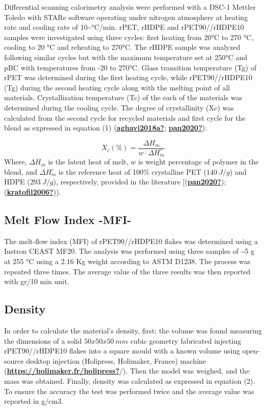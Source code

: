 \documentclass[
  12pt,
  number,
  review]{elsarticle}
\begin{document}
Differential scanning calorimetry analysis were performed with a DSC-1
Mettler Toledo with STARe software operating under nitrogen atmosphere
at heating rate and cooling rate of 10\textasciitilde°C/min. rPET, rHDPE
and rPET90//rHDPE10 samples were investigated using three cycles: first
heating from 20°C to 270 °C, cooling to 20 °C and reheating to 270°C.
The rHDPE sample was analyzed following similar cycles but with the
maximum temperature set at 250°C and pBC with temperatures from -20 to
270°C. Glass transition temperature (Tg) of rPET was determined during
the first heating cycle, while rPET90//rHDPE10 (Tg) during the second
heating cycle along with the melting point of all materials.
Crystallization temperature (Tc) of the each of the materials was
determined during the cooling cycle. The degree of crystallinity (Xc)
was calculated from the second cycle for recycled materials and first
cycle for the blend as expressed in equation (1)
(\protect\hyperlink{ref-aghavi2018a}{\textbf{aghavi2018a?}};
\protect\hyperlink{ref-pan2020}{\textbf{pan2020?}}):

\[
X_{c}(\%) = \frac{\Delta H_{m}}{w \cdot \Delta H_{m}^\circ}
\] Where, \(\Delta H_{m}\) is the latent heat of melt, \(w\) is weight
percentage of polymer in the blend, and \(\Delta H_{m}^\circ\) is the
reference heat of 100\% crystalline PET (\(140~J/g\)) and HDPE
(\(293~J/g\)), respectively, provided in the literature
{[}(\protect\hyperlink{ref-pan2020}{\textbf{pan2020?}});
(\protect\hyperlink{ref-kratofil2006}{\textbf{kratofil2006?}})).

\hypertarget{melt-flow-index--mfi-}{%
\subsection{Melt Flow Index -MFI-}\label{melt-flow-index--mfi-}}

The melt-flow index (MFI) of rPET90//rHDPE10 flakes was determined using
a Instron CEAST MF20. The analysis was performed using three samples of
\textasciitilde5 g at 255 °C using a 2.16 Kg weight according to ASTM
D1238. The process was repeated three times. The average value of the
three results was then reported with gr/10 min unit.

\hypertarget{density}{%
\subsection{Density}\label{density}}

In order to calculate the material's density, first; the volume was
found measuring the dimensions of a solid \(50x50x50~mm\) cubic geometry
fabricated injecting rPET90//rHDPE10 flakes into a square mould with a
known volume using open-source desktop injection (Holipress, Holimaker,
France) machine
(\protect\hyperlink{ref-https:ux2fux2fholimaker.frux2fholipress}{\textbf{https://holimaker.fr/holipress?}}/).
Then the model was weighed, and the mass was obtained. Finally, density
was calculated as expressed in equation (2). To ensure the accuracy the
test was performed twice and the average value was reported in g/cm3.
\end{document}
